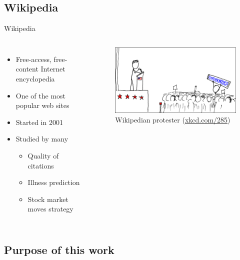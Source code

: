 \documentclass{beamer}
\begin{document}
\subsection{Wikipedia}
\begin{frame}[c]{Wikipedia}
    \begin{columns}
        \begin{itemize}
            \item Free-access, free-content Internet encyclopedia
            \item One of the most popular web sites
            \item Started in 2001
            \item Studied by many
            \begin{itemize}
                \item Quality of citations~\cite{Nielsen2007}
                \item Illness prediction~\cite{McIver2014}
                \item Stock market moves strategy~\cite{Moat2013}
            \end{itemize}
        \end{itemize}
        \begin{figure}
        \centering
        \includegraphics[width=\textwidth]{assets/wikipedian_protester}
        \caption{\centering Wikipedian protester (\url{xkcd.com/285})}
        \end{figure}
    \end{columns}
\end{frame}

\subsection{Purpose of this work}
\end{document}

